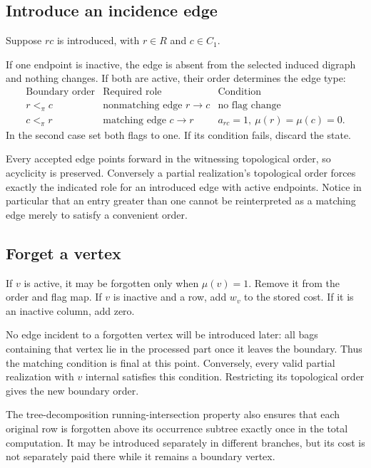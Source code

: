 \documentclass[11pt]{article}
\theoremstyle{definition}\newtheorem{definition}[theorem]{Definition}
\theoremstyle{remark}\newtheorem{remark}[theorem]{Remark}
\begin{document}
\subsection{Introduce an incidence edge}
Suppose $rc$ is introduced, with $r\in R$ and $c\in C_1$.

If one endpoint is inactive, the edge is absent from the selected induced digraph and nothing changes. If both are active, their order determines the edge type:
\begin{equation}
\begin{array}{c|c|c}
\text{Boundary order}&\text{Required role}&\text{Condition}\\ \hline
r<_{\pi}c & \text{nonmatching edge }r\to c & \text{no flag change}\\
c<_{\pi}r & \text{matching edge }c\to r & a_{rc}=1,\ \mu(r)=\mu(c)=0.
\end{array}
\label{eq:edgeevent}
\end{equation}
In the second case set both flags to one. If its condition fails, discard the state.

Every accepted edge points forward in the witnessing topological order, so acyclicity is preserved. Conversely a partial realization's topological order forces exactly the indicated role for an introduced edge with active endpoints. Notice in particular that an entry greater than one cannot be reinterpreted as a matching edge merely to satisfy a convenient order.

\subsection{Forget a vertex}
If $v$ is active, it may be forgotten only when $\mu(v)=1$. Remove it from the order and flag map. If $v$ is inactive and a row, add $w_v$ to the stored cost. If it is an inactive column, add zero.

No edge incident to a forgotten vertex will be introduced later: all bags containing that vertex lie in the processed part once it leaves the boundary. Thus the matching condition is final at this point. Conversely, every valid partial realization with $v$ internal satisfies this condition. Restricting its topological order gives the new boundary order.

The tree-decomposition running-intersection property also ensures that each original row is forgotten above its occurrence subtree exactly once in the total computation. It may be introduced separately in different branches, but its cost is not separately paid there while it remains a boundary vertex.
\end{document}
